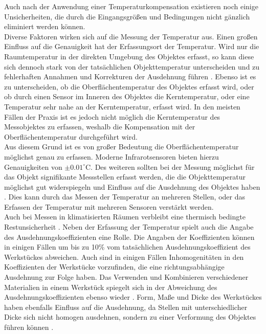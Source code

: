 Auch nach der Anwendung einer Temperaturkompensation existieren noch einige Unsicherheiten, die durch die Eingangsgrößen und Bedingungen nicht gänzlich eliminiert werden können.\\
Diverse Faktoren wirken sich auf die Messung der Temperatur aus. Einen großen Einfluss auf die Genauigkeit hat der Erfassungsort der Temperatur. Wird nur die Raumtemperatur in der direkten Umgebung des Objektes erfasst, so kann diese sich dennoch stark von der tatsächlichen Objekttemperatur unterscheiden und zu fehlerhaften Annahmen und Korrekturen der Ausdehnung führen \cite{Neumann08}. Ebenso ist es zu unterscheiden, ob die Oberflächentemperatur des Objektes erfasst wird, oder ob durch einen Sensor im Inneren des Objektes die Kerntemperatur, oder eine Temperatur sehr nahe an der Kerntemperatur, erfasst wird. In den meisten Fällen der Praxis ist es jedoch nicht möglich die Kerntemperatur des Messobjektes zu erfassen, weshalb die Kompensation mit der Oberflächentemperatur durchgeführt wird.\\
Aus diesem Grund ist es von großer Bedeutung die Oberflächentemperatur möglichst genau zu erfassen. Moderne Infrarotsensoren bieten hierzu Genauigkeiten von $\pm0.01^\circ\text{C}$\cite{Doiron2006}. Des weiteren sollten bei der Messung möglichst für das Objekt signifikante Messstellen erfasst werden, die die Objekttemperatur möglichst gut widerspiegeln und Einfluss auf die Ausdehnung des Objektes haben \cite{Fletcher2005}. Dies kann durch das Messen der Temperatur an mehreren Stellen, oder das Erfassen der Temperatur mit mehreren Sensoren verstärkt werden.\\
Auch bei Messen in klimatisierten Räumen verbleibt eine thermisch bedingte Restunsicherheit \cite{Neumann08}.
Neben der Erfassung der Temperatur spielt auch die Angabe des Ausdehnungskoeffizienten eine Rolle. Die Angaben der Koeffizienten können in einigen Fällen um bis zu 10\% vom tatsächlichen Ausdehnungskoeffizient des Werkstückes abweichen. Auch sind in einigen Fällen Inhomogenitäten in den Koeffizienten der Werkstücke vorzufinden, die eine richtungsabhängige Ausdehnung zur Folge haben. Das Verwenden und Kombinieren verschiedener Materialien in einem Werkstück spiegelt sich in der Abweichung des Ausdehnungskoeffizienten ebenso wieder \cite{Bryan1965}. Form, Maße und Dicke des Werkstückes haben ebenfalls Einfluss auf die Ausdehnung, da Stellen mit unterschiedlicher Dicke sich nicht homogen ausdehnen, sondern zu einer Verformung des Objektes führen können \cite{Neumann08}. \\
